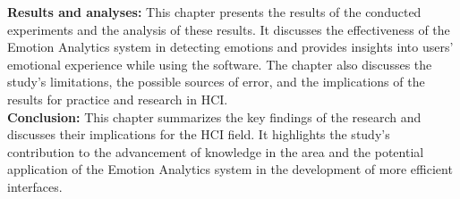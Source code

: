 \begin{english-abstract}
  \textbf{Results and analyses:} This chapter presents the results of the conducted experiments and the analysis of these results. It discusses the effectiveness of the Emotion Analytics system in detecting emotions and provides insights into users' emotional experience while using the software. The chapter also discusses the study's limitations, the possible sources of error, and the implications of the results for practice and research in HCI.
  \\

  \textbf{Conclusion:} This chapter summarizes the key findings of the research and discusses their implications for the HCI field. It highlights the study's contribution to the advancement of knowledge in the area and the potential application of the Emotion Analytics system in the development of more efficient interfaces.
\end{english-abstract}
